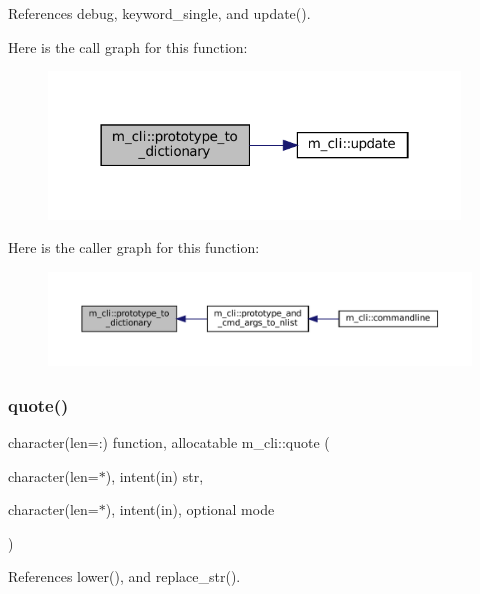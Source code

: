 References debug, keyword\+\_\+single, and update().

Here is the call graph for this function\+:
\nopagebreak
\begin{figure}[H]
\begin{center}
\leavevmode
\includegraphics[width=310pt]{namespacem__cli_a8c62537a2d224364c9cb30005be819e9_cgraph}
\end{center}
\end{figure}
Here is the caller graph for this function\+:
\nopagebreak
\begin{figure}[H]
\begin{center}
\leavevmode
\includegraphics[width=350pt]{namespacem__cli_a8c62537a2d224364c9cb30005be819e9_icgraph}
\end{center}
\end{figure}
\mbox{\label{namespacem__cli_ac82fec2a5441020701fe3c64af3d9948}} 
\subsubsection{\texorpdfstring{quote()}{quote()}}
{\footnotesize\ttfamily character(len=\+:) function, allocatable m\+\_\+cli\+::quote (\begin{DoxyParamCaption}\item[{character(len=$\ast$), intent(in)}]{str,  }\item[{character(len=$\ast$), intent(in), optional}]{mode }\end{DoxyParamCaption})\hspace{0.3cm}{\ttfamily [private]}}



References lower(), and replace\+\_\+str().

